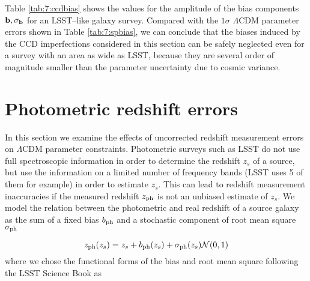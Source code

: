 %
Table \ref{tab:7:ccdbias} shows the values for the amplitude of the bias components $\mathbf{b},\sigma_{\mathbf{b}}$ for an LSST--like galaxy survey. Compared with the $1\sigma$ $\Lambda$CDM parameter errors shown in Table \ref{tab:7:spbias}, we can conclude that the biases induced by the CCD imperfections considered in this section can be safely neglected even for a survey with an area as wide as LSST, because they are several order of magnitude smaller than the parameter uncertainty due to cosmic variance.  

\section{Photometric redshift errors}
\label{sec:7:photoz}
In this section we examine the effects of uncorrected redshift measurement errors on $\Lambda$CDM parameter constraints. Photometric surveys such as LSST do not use full spectroscopic information in order to determine the redshift $z_s$ of a source, but use the information on a limited number of frequency bands (LSST uses 5 of them for example) in order to estimate $z_s$. This can lead to redshift measurement inaccuracies if the measured redshift $z_{\rm ph}$ is not an unbiased estimate of $z_s$. We model the relation between the photometric and real redshift of a source galaxy as the sum of a fixed bias $b_{\rm ph}$ and a stochastic component of root mean square $\sigma_{\rm ph}$ \citep{PetriPhotoZ,LSSTSciBook} 

\begin{equation}
\label{eq:7:phreal}
z_{\rm ph}(z_s) = z_s + b_{\rm ph}(z_s) + \sigma_{\rm ph}(z_s)\mathcal{N}(0,1)
\end{equation}
%
where we chose the functional forms of the bias and root mean square following the LSST Science Book \citep{LSSTSciBook} as 

